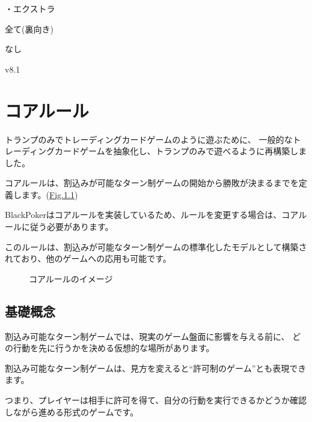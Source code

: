 \documentclass[letterpaper,10pt,dvipdfmx]{sphinxmanual}
\begin{document}
\sphinxAtStartPar
・エクストラ

\sphinxAtStartPar
{} 全て(裏向き)

\sphinxAtStartPar
{}

\sphinxAtStartPar
なし

\sphinxAtStartPar
{}  v8.1

\sphinxstepscope


\chapter{コアルール}
\label{\detokenize{core/core:core-rst}}\label{\detokenize{core/core:id1}}\label{\detokenize{core/core::doc}}
\sphinxAtStartPar
トランプのみでトレーディングカードゲームのように遊ぶために、
一般的なトレーディングカードゲームを抽象化し、トランプのみで遊べるように再構築しました。

\sphinxAtStartPar
コアルールは、割込みが可能なターン制ゲームの開始から勝敗が決まるまでを定義します。(\hyperref[\detokenize{core/core:abstract-core-rule}]{Fig.\@ \ref{\detokenize{core/core:abstract-core-rule}}})

\sphinxAtStartPar
BlackPokerはコアルールを実装しているため、ルールを変更する場合は、コアルールに従う必要があります。

\sphinxAtStartPar
このルールは、割込みが可能なターン制ゲームの標準化したモデルとして構築されており、他のゲームへの応用も可能です。

\begin{figure}[htbp]
\centering
\capstart

\noindent{}
\caption{コアルールのイメージ}\label{\detokenize{core/core:id34}}\label{\detokenize{core/core:abstract-core-rule}}\end{figure}


\section{基礎概念}
\label{\detokenize{core/core:id2}}
\sphinxAtStartPar
割込み可能なターン制ゲームでは、現実のゲーム盤面に影響を与える前に、
どの行動を先に行うかを決める仮想的な場所があります。

\sphinxAtStartPar
割込み可能なターン制ゲームは、見方を変えると“許可制のゲーム”とも表現できます。

\sphinxAtStartPar
つまり、プレイヤーは相手に許可を得て、自分の行動を実行できるかどうか確認しながら進める形式のゲームです。
\end{document}
